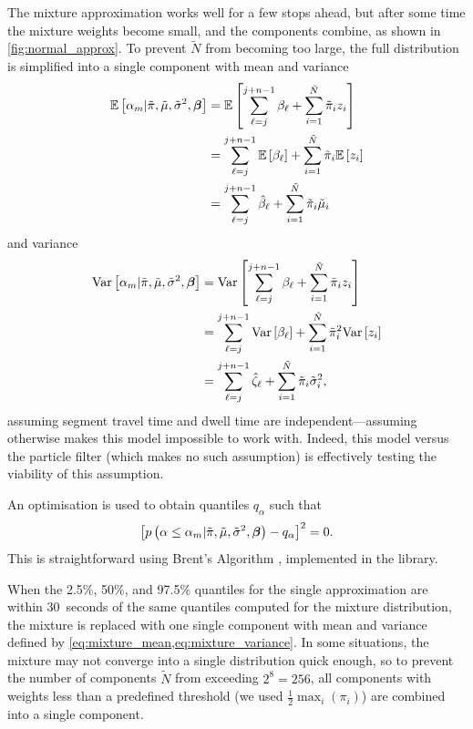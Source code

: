 The mixture approximation works well for a few stops ahead, but after some time the mixture weights become small, and the components combine, as shown in \cref{fig:normal_approx}. To prevent $\tilde N$ from becoming too large, the full distribution is simplified into a single component with mean and variance
\begin{equation}
\label{eq:mixture_mean}
\begin{split}
\mathbb{E}\left[\alpha_m | \tilde\pi, \tilde\mu, \tilde\sigma^2, \boldsymbol\beta\right] &=
\mathbb{E}\left[\sum_{\ell=j}^{j+n-1} \beta_\ell +
  \sum_{i=1}^{\tilde N} \tilde\pi_i z_i\right] \\
&= \sum_{\ell=j}^{j+n-1} \mathbb{E}\left[\beta_\ell\right] +
  \sum_{i=1}^{\tilde N} \tilde\pi_i \mathbb{E}\left[z_i\right] \\
&= \sum_{\ell=j}^{j+n-1} \hat{\beta}_\ell +
  \sum_{i=1}^{\tilde N} \tilde\pi_i \tilde\mu_i
\end{split}
\end{equation}
and variance
\begin{equation}
\label{eq:mixture_variance}
\begin{split}
\mathrm{Var}\left[\alpha_m | \tilde\pi, \tilde\mu, \tilde\sigma^2, \boldsymbol\beta\right] &=
\mathrm{Var}\left[\sum_{\ell=j}^{j+n-1} \beta_\ell +
  \sum_{i=1}^{\tilde N} \tilde\pi_i z_i\right] \\
&= \sum_{\ell=j}^{j+n-1} \mathrm{Var}\left[\beta_\ell\right] +
  \sum_{i=1}^{\tilde N} \tilde\pi_i^2 \mathrm{Var}\left[z_i\right] \\
&= \sum_{\ell=j}^{j+n-1} \hat{\zeta}_\ell +
  \sum_{i=1}^{\tilde N} \tilde\pi_i \tilde\sigma_i^2,
\end{split}
\end{equation}
assuming segment travel time and dwell time are independent---assuming otherwise makes this model impossible to work with. Indeed, this model versus the particle filter (which makes no such assumption) is effectively testing the viability of this assumption.


An optimisation is used to obtain quantiles $q_\alpha$ such that
\begin{equation}
\label{eq:mixture_quadratic}
\left[
  p\left(\alpha \leq \alpha_m | \tilde\pi, \tilde\mu, \tilde\sigma^2, \boldsymbol\beta\right) - q_\alpha
\right]^2 = 0.
\end{equation}
This is straightforward using Brent's Algorithm \citep{Brent_1971}, implemented in the  \Cpp{} library.

When the 2.5\%, 50\%, and 97.5\% quantiles for the single approximation are within 30~seconds of the same quantiles computed for the mixture distribution, the mixture is replaced with one single component with mean and variance defined by \cref{eq:mixture_mean,eq:mixture_variance}. In some situations, the mixture may not converge into a single distribution quick enough, so to prevent the number of components $\tilde N$ from exceeding $2^8=256$, all components with weights less than a predefined threshold (we used $\frac{1}{2}\max_i(\pi_i)$) are combined into a single component.
